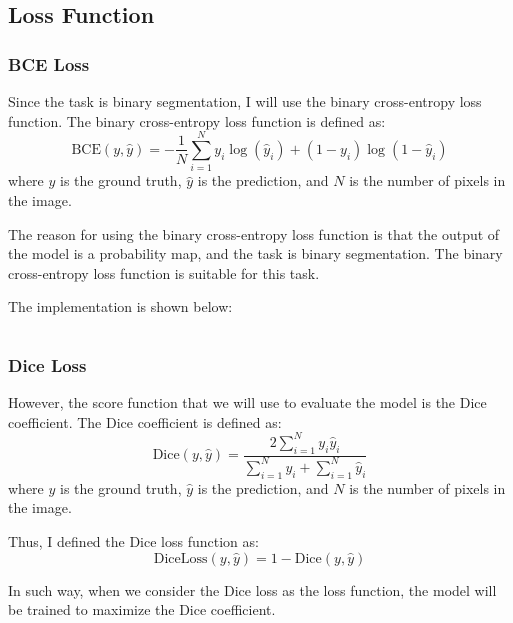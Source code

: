 \subsection{Loss Function}
\label{sec:loss_function}

\subsubsection{BCE Loss}

Since the task is binary segmentation, I will use the binary cross-entropy loss function.
The binary cross-entropy loss function is defined as:
\begin{equation}
    \text{BCE}(y, \hat{y}) = -\frac{1}{N} \sum_{i=1}^{N} y_i \log(\hat{y}_i) + (1 - y_i) \log(1 - \hat{y}_i)
\end{equation}
where $y$ is the ground truth, $\hat{y}$ is the prediction, and $N$ is the number of pixels in the image.

The reason for using the binary cross-entropy loss function is that the output of the model is a probability map, and the task is binary segmentation.
The binary cross-entropy loss function is suitable for this task.

The implementation is shown below:

\inputminted[firstline=38, lastline=43, highlightlines=40]{python}{../src/utils.py}

\subsubsection{Dice Loss}

However, the score function that we will use to evaluate the model is the Dice coefficient.
The Dice coefficient is defined as:
\begin{equation}
    \text{Dice}(y, \hat{y}) = \frac{2 \sum_{i=1}^{N} y_i \hat{y}_i}{\sum_{i=1}^{N} y_i + \sum_{i=1}^{N} \hat{y}_i}
\end{equation}
where $y$ is the ground truth, $\hat{y}$ is the prediction, and $N$ is the number of pixels in the image.

Thus, I defined the Dice loss function as:
\begin{equation}
    \text{DiceLoss}(y, \hat{y}) = 1 - \text{Dice}(y, \hat{y})
\end{equation}

In such way, when we consider the Dice loss as the loss function, the model will be trained to maximize the Dice coefficient.

